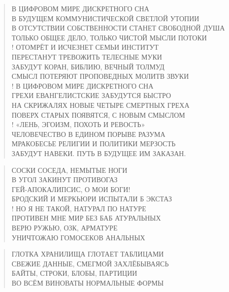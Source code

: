\poemtitle{***}
\begin{verse}
В ЦИФРОВОМ МИРЕ ДИСКРЕТНОГО СНА\\
В БУДУЩЕМ КОММУНИСТИЧЕСКОЙ СВЕТЛОЙ УТОПИИ\\
В ОТСУТСТВИИ СОБСТВЕННОСТИ СТАНЕТ СВОБОДНОЙ ДУША\\
ТОЛЬКО ОБЩЕЕ ДЕЛО, ТОЛЬКО ЧИСТОЙ МЫСЛИ ПОТОКИ\\!
ОТОМРЁТ И ИСЧЕЗНЕТ СЕМЬИ ИНСТИТУТ\\
ПЕРЕСТАНУТ ТРЕВОЖИТЬ ТЕЛЕСНЫЕ МУКИ\\
ЗАБУДУТ КОРАН, БИБЛИЮ, ВЕЧНЫЙ ТОЛМУД\\
СМЫСЛ ПОТЕРЯЮТ ПРОПОВЕДНЫХ МОЛИТВ ЗВУКИ\\!
В ЦИФРОВОМ МИРЕ ДИСКРЕТНОГО СНА\\
ГРЕХИ ЕВАНГЕЛИСТСКИЕ ЗАБУДУТСЯ БЫСТРО\\
НА СКРИЖАЛЯХ НОВЫЕ ЧЕТЫРЕ СМЕРТНЫХ ГРЕХА\\
ПОВЕРХ СТАРЫХ ПОЯВЯТСЯ, С НОВЫМ СМЫСЛОМ\\!
«ЛЕНЬ, ЭГОИЗМ, ПОХОТЬ И РЕВОСТЬ»\\
ЧЕЛОВЕЧЕСТВО В ЕДИНОМ ПОРЫВЕ РАЗУМА\\
МРАКОБЕСЬЕ РЕЛИГИИ И ПОЛИТИКИ МЕРЗОСТЬ\\
ЗАБУДУТ НАВЕКИ. ПУТЬ В БУДУЩЕЕ ИМ ЗАКАЗАН.
\end{verse}

\poemtitle{***}
\begin{verse}
СОСКИ СОСЕДА, НЕМЫТЫЕ НОГИ\\
В УГОЛ ЗАКИНУТ ПРОТИВОГАЗ\\
ГЕЙ-АПОКАЛИПСИС, О МОИ БОГИ!\\
БРОДСКИЙ И МЕРКЬЮРИ ИСПЫТАЛИ Б ЭКСТАЗ\\!
НО Я НЕ ТАКОЙ, НАТУРАЛ ПО НАТУРЕ\\
ПРОТИВЕН МНЕ МИР БЕЗ БАБ АТУРАЛЬНЫХ\\
ВЕРЮ РУЖЬЮ, ОЗК, АРМАТУРЕ\\
УНИЧТОЖАЮ ГОМОСЕКОВ АНАЛЬНЫХ
\end{verse}

\poemtitle{***}
\begin{verse}
ГЛОТКА ХРАНИЛИЩА ГЛОТАЕТ ТАБЛИЦАМИ\\
СВЕЖИЕ ДАННЫЕ, СМЕГМОЙ ЗАХЛЁБЫВАЯСЬ\\
БАЙТЫ, СТРОКИ, БЛОБЫ, ПАРТИЦИИ\\
ВО ВСЁМ ВИНОВАТЫ НОРМАЛЬНЫЕ ФОРМЫ
\end{verse}

